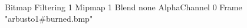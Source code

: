 {Bitmap
	{Filtering 1}
	{Mipmap 1}
	{Blend none}
	{AlphaChannel 0}
	{Frame "arbusto1#burned.bmp"}
}
